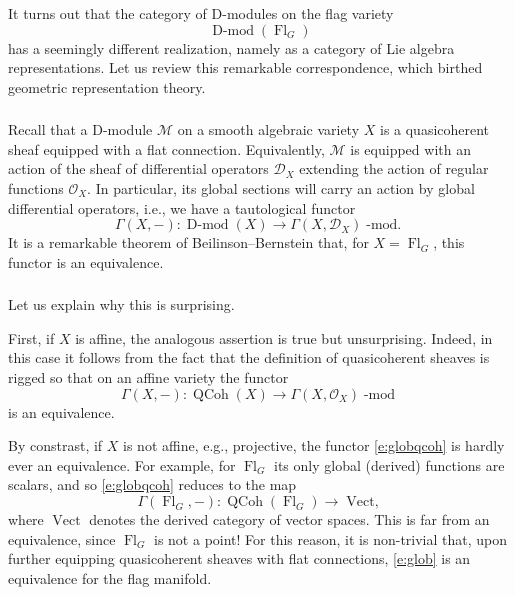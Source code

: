 \documentclass[10pt]{amsart}
\newcommand{\sB}{\on{Fl}_G}
\newcommand{\sM}{\mathscr{M}}
\newcommand{\on}{\operatorname}
\renewcommand{\mod}{\on{-mod}}
\newcommand{\Dmod}{\on{D-mod}}
\theoremstyle{remark}
\newcommand{\Fl}{\operatorname{Fl}}
\newcommand{\C}{\ensuremath{\mathbb{C}}}
\newcommand{\Z}{\ensuremath{\mathbb{Z}}}
\newcommand{\OO}{\mathscr{O}}
\newcommand{\sD}{\mathscr{D}}
\numberwithin{equation}{section}
\renewcommand{\mod}{\operatorname{-mod}}
\begin{document}

	
	
	\subsubsection{} It turns out that the category of D-modules on the flag variety 
	$$\Dmod(\Fl_G)$$has a seemingly different realization, namely as a category of 
	Lie algebra representations. Let us review this remarkable correspondence, 
	which birthed geometric representation theory. 
	
	
	\subsubsection{} Recall that a D-module $\sM$ on a smooth algebraic variety 
	$X$ is a quasicoherent sheaf equipped with a flat connection. Equivalently, 
	$\sM$ is equipped with an action of the sheaf of differential operators 
	$\sD_X$ extending the action of regular functions $\OO_X$. In particular, 
	its global sections will carry an action by global differential operators, 
	i.e., we have a tautological functor
	\begin{equation} \label{e:glob}
	\Gamma(X, -): \Dmod(X) \rightarrow \Gamma(X, \sD_X)\on{-mod.} 
	\end{equation}
	It is a remarkable theorem of Beilinson--Bernstein that, for $X = \sB$, this 
	functor is an equivalence. 
	
	
	
	\subsubsection{} Let us explain why this is surprising. 
	
	First, if $X$ is affine, the analogous assertion is true but unsurprising. 
	Indeed, in this case it follows from the fact that the definition of 
	quasicoherent sheaves is rigged so that on an affine variety the functor
	\begin{equation} \label{e:globqcoh}
	\Gamma(X, -): \on{QCoh}(X) \rightarrow \Gamma(X, \OO_X)\mod
	\end{equation}
	is an equivalence. 
	
	By constrast, if $X$ is not affine, e.g., projective, the functor 
	\eqref{e:globqcoh} is hardly ever an equivalence. For example, for $\sB$ 
	its only global (derived) functions are scalars, and so \eqref{e:globqcoh} 
	reduces to the map
	\[
	\Gamma(\sB, -): \on{QCoh}(\sB) \rightarrow \on{Vect,} 
	\]
	where $\on{Vect}$ denotes the derived category of vector spaces. This is far from an equivalence, since $\sB$ is not a point! For this 
	reason, it is non-trivial that, upon further equipping quasicoherent 
	sheaves with flat connections, \eqref{e:glob} is an equivalence for the 
	flag manifold. 
	
\end{document}
